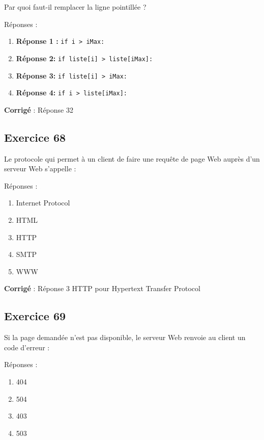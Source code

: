 \documentclass[11pt]{article}
\providecommand{\tightlist}{%
      \setlength{\itemsep}{0pt}\setlength{\parskip}{0pt}}
\begin{document}
Par quoi faut-il remplacer la ligne pointillée ?

Réponses :

\begin{enumerate}
\def\labelenumi{\arabic{enumi}.}
\tightlist
\item
  \textbf{Réponse 1 :} \texttt{if\ i\ \textgreater{}\ iMax:}
\item
  \textbf{Réponse 2:}
  \texttt{if\ liste{[}i{]}\ \textgreater{}\ liste{[}iMax{]}:}
\item
  \textbf{Réponse 3:} \texttt{if\ liste{[}i{]}\ \textgreater{}\ iMax:}
\item
  \textbf{Réponse 4:} \texttt{if\ i\ \textgreater{}\ liste{[}iMax{]}:}
\end{enumerate}

    \textbf{Corrigé} : Réponse 32

    \hypertarget{exercice-68}{%
\subsection{Exercice 68}\label{exercice-68}}

Le protocole qui permet à un client de faire une requête de page Web
auprès d'un serveur Web s'appelle :

Réponses :

\begin{enumerate}
\def\labelenumi{\arabic{enumi}.}
\tightlist
\item
  Internet Protocol
\item
  HTML
\item
  HTTP
\item
  SMTP
\item
  WWW
\end{enumerate}

    \textbf{Corrigé} : Réponse 3 HTTP pour Hypertext Transfer Protocol

    \hypertarget{exercice-69}{%
\subsection{Exercice 69}\label{exercice-69}}

Si la page demandée n'est pas disponible, le serveur Web renvoie au
client un code d'erreur :

Réponses :

\begin{enumerate}
\def\labelenumi{\arabic{enumi}.}
\item
  404
\item
  504
\item
  403
\item
  503
\end{enumerate}
\end{document}
